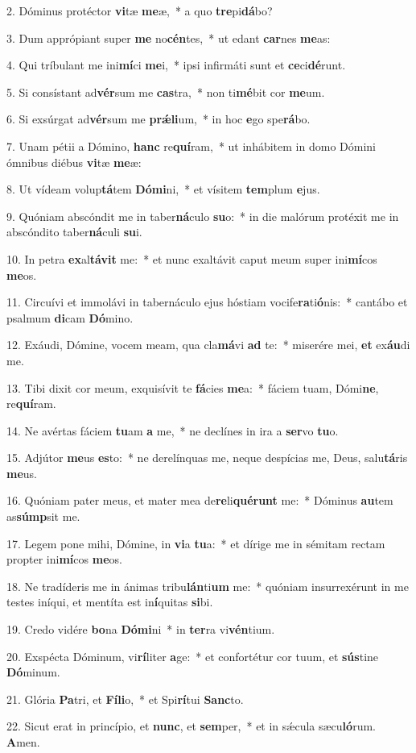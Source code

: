 2. Dóminus protéctor \textbf{vi}tæ \textbf{me}æ,~*  a quo \textbf{tre}pi\textbf{dá}bo?\

3. Dum apprópiant super \textbf{me} no\textbf{cén}tes,~*  ut edant \textbf{car}nes \textbf{me}as:\

4. Qui tríbulant me ini\textbf{mí}ci \textbf{me}i,~*  ipsi infirmáti sunt et \textbf{ce}ci\textbf{dé}runt.\

5. Si consístant ad\textbf{vér}sum me \textbf{cas}tra,~*  non ti\textbf{mé}bit cor \textbf{me}um.\

6. Si exsúrgat ad\textbf{vér}sum me \textbf{prǽ}\textbf{li}um,~*  in hoc \textbf{e}go spe\textbf{rá}bo.\

7. Unam pétii a Dómino, \textbf{hanc} re\textbf{quí}ram,~*  ut inhábitem in domo Dómini ómnibus diébus \textbf{vi}tæ \textbf{me}æ:\

8. Ut vídeam volup\textbf{tá}tem \textbf{Dó}\textbf{mi}ni,~*  et vísitem \textbf{tem}plum \textbf{e}jus.\

9. Quóniam abscóndit me in taber\textbf{ná}culo \textbf{su}o:~*  in die malórum protéxit me in abscóndito taber\textbf{ná}culi \textbf{su}i.\

10. In petra \textbf{ex}al\textbf{tá}\textbf{vit} me:~*  et nunc exaltávit caput meum super ini\textbf{mí}cos \textbf{me}os.\

11. Circuívi et immolávi in tabernáculo ejus hóstiam vocife\textbf{ra}ti\textbf{ó}nis:~*  cantábo et psalmum \textbf{di}cam \textbf{Dó}mino.\

12. Exáudi, Dómine, vocem meam, qua cla\textbf{má}vi \textbf{ad} te:~*  miserére mei, \textbf{et} ex\textbf{áu}di me.\

13. Tibi dixit cor meum, exquisívit te \textbf{fá}cies \textbf{me}a:~*  fáciem tuam, Dómi\textbf{ne}, re\textbf{quí}ram.\

14. Ne avértas fáciem \textbf{tu}am \textbf{a} me,~*  ne declínes in ira a \textbf{ser}vo \textbf{tu}o.\

15. Adjútor \textbf{me}us \textbf{es}to:~*  ne derelínquas me, neque despícias me, Deus, salu\textbf{tá}ris \textbf{me}us.\

16. Quóniam pater meus, et mater mea de\textbf{re}li\textbf{qué}\textbf{runt} me:~*  Dóminus \textbf{au}tem as\textbf{súmp}sit me.\

17. Legem pone mihi, Dómine, in \textbf{vi}a \textbf{tu}a:~*  et dírige me in sémitam rectam propter ini\textbf{mí}cos \textbf{me}os.\

18. Ne tradíderis me in ánimas tribu\textbf{lán}ti\textbf{um} me:~*  quóniam insurrexérunt in me testes iníqui, et mentíta est in\textbf{í}quitas \textbf{si}bi.\

19. Credo vidére \textbf{bo}na \textbf{Dó}\textbf{mi}ni~*  in \textbf{ter}ra vi\textbf{vén}tium.\

20. Exspécta Dóminum, vi\textbf{rí}liter \textbf{a}ge:~*  et confortétur cor tuum, et \textbf{sús}tine \textbf{Dó}minum.\

21. Glória \textbf{Pa}tri, et \textbf{Fí}\textbf{li}o,~*  et Spi\textbf{rí}tui \textbf{Sanc}to.\

22. Sicut erat in princípio, et \textbf{nunc}, et \textbf{sem}per,~*  et in sǽcula sæcu\textbf{ló}rum. \textbf{A}men.\

